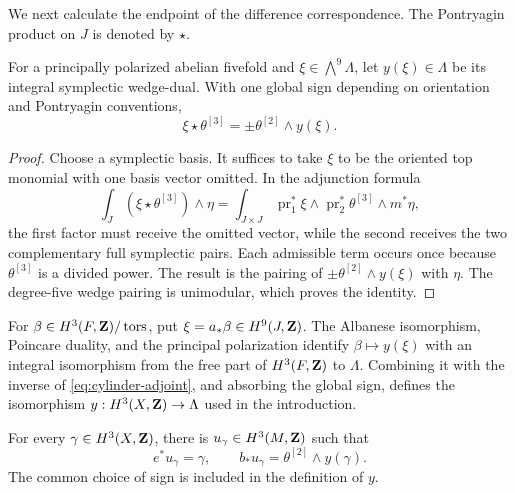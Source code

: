 We next calculate the endpoint of the difference correspondence.  The
Pontryagin product on \(J\) is denoted by \(\star\).

\begin{lemma}\label{lem:pontryagin-endpoint}
For a principally polarized abelian fivefold and
\(\xi\in\bigwedge^9\Lambda\), let \(y(\xi)\in\Lambda\) be its integral
symplectic wedge-dual.  With one global sign depending on orientation and
Pontryagin conventions,
\begin{equation}\label{eq:pontryagin-endpoint}
 \xi\star\theta^{[3]}=\pm\theta^{[2]}\wedge y(\xi).
\end{equation}
\end{lemma}

\begin{proof}
Choose a symplectic basis.  It suffices to take \(\xi\) to be the oriented
top monomial with one basis vector omitted.  In the adjunction formula
\[
 \int_J(\xi\star\theta^{[3]})\wedge\eta
 =\int_{J\times J}\operatorname{pr}_1^*\xi\wedge
 \operatorname{pr}_2^*\theta^{[3]}\wedge m^*\eta,
\]
the first factor must receive the omitted vector, while the second receives
the two complementary full symplectic pairs.  Each admissible term occurs
once because \(\theta^{[3]}\) is a divided power.  The result is the pairing
of \(\pm\theta^{[2]}\wedge y(\xi)\) with \(\eta\).  The degree-five wedge
pairing is unimodular, which proves the identity.
\end{proof}

For \(\beta\in H^3(F,\mathbf Z)/\operatorname{tors}\), put
\(\xi=a_*\beta\in H^9(J,\mathbf Z)\).  The Albanese isomorphism, Poincare duality,
and the principal polarization identify \(\beta\mapsto y(\xi)\) with an
integral isomorphism from the free part of \(H^3(F,\mathbf Z)\) to \(\Lambda\).
Combining it with the inverse of \eqref{eq:cylinder-adjoint}, and absorbing
the global sign, defines the isomorphism
\(y:H^3(X,\mathbf Z)\to\Lambda\) used in the introduction.

\begin{proposition}\label{prop:endpoint-lifts}
For every \(\gamma\in H^3(X,\mathbf Z)\), there is
\(u_\gamma\in H^3(M,\mathbf Z)\) such that
\begin{equation}\label{eq:endpoint-lift}
 e^*u_\gamma=\gamma,
 \qquad
 b_*u_\gamma=\theta^{[2]}\wedge y(\gamma).
\end{equation}
The common choice of sign is included in the definition of \(y\).
\end{proposition}

